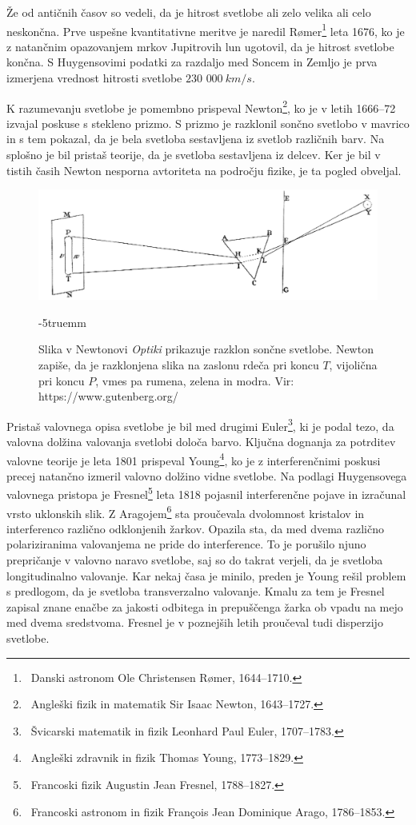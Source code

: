 Že od antičnih časov so vedeli, da
je hitrost svetlobe ali zelo velika ali celo neskončna. Prve uspešne kvantitativne
meritve je naredil R\o{}mer\footnote{~Danski astronom
Ole Christensen R\o{}mer, 1644--1710.} leta 1676, ko je z natančnim opazovanjem 
mrkov Jupitrovih lun ugotovil, da je hitrost svetlobe končna. S Huygensovimi 
podatki za razdaljo med Soncem in Zemljo je prva izmerjena vrednost hitrosti
svetlobe $230\,\,000~\si{km/s}$.

K razumevanju svetlobe je pomembno prispeval Newton\footnote{~Angleški 
fizik in matematik Sir Isaac Newton, 1643--1727.}, ko je v letih 1666--72 
izvajal poskuse s stekleno prizmo. S prizmo je razklonil sončno svetlobo v
mavrico in s tem pokazal, da je bela svetloba sestavljena 
iz svetlob različnih barv. Na splošno je bil pristaš teorije, da je 
svetloba sestavljena iz delcev. Ker je bil v tistih časih 
Newton nesporna avtoriteta na področju fizike, je ta pogled obveljal.
\begin{figure}[ht]
\centering
\includegraphics[width=10truecm]{slike/01_Newton.jpg}
\caption{Slika v Newtonovi {\it Optiki} prikazuje razklon sončne svetlobe. Newton 
zapiše, da je razklonjena slika na zaslonu rdeča pri koncu $T$, vijolična
pri koncu $P$, vmes pa rumena, zelena in modra. Vir: https://www.gutenberg.org/}
\label{fig:01_Newton}
\vglue-5truemm
\end{figure}

Pristaš valovnega opisa svetlobe je bil med drugimi Euler\footnote{~Švicarski 
matematik in fizik Leonhard Paul Euler, 1707--1783.}, ki je podal tezo, 
da valovna dolžina valovanja svetlobi določa barvo.
Ključna dognanja za potrditev valovne teorije je leta 1801 prispeval 
Young\footnote{~Angleški zdravnik in fizik Thomas Young, 1773--1829.}, 
ko je z interferenčnimi poskusi precej natančno izmeril valovno dolžino 
vidne svetlobe. Na podlagi Huygensovega valovnega pristopa je 
Fresnel\footnote{~Francoski fizik Augustin Jean Fresnel, 1788--1827.}
leta 1818 pojasnil interferenčne pojave in izračunal vrsto 
uklonskih slik. Z Aragojem\footnote{~Francoski astronom in fizik
Fran\c{c}ois Jean Dominique Arago, 1786--1853.} sta proučevala 
dvolomnost kristalov in interferenco različno odklonjenih žarkov. 
Opazila sta, da med dvema različno polariziranima valovanjema ne 
pride do interference. To je porušilo njuno prepričanje v valovno 
naravo svetlobe, saj so do takrat verjeli, da je svetloba
longitudinalno valovanje. Kar nekaj časa je minilo, preden je Young 
rešil problem s predlogom, da je svetloba transverzalno valovanje.
Kmalu za tem je Fresnel zapisal znane enačbe za jakosti odbitega 
in prepuščenga žarka ob vpadu na mejo med dvema sredstvoma.
Fresnel je v poznejših letih proučeval tudi disperzijo svetlobe.

